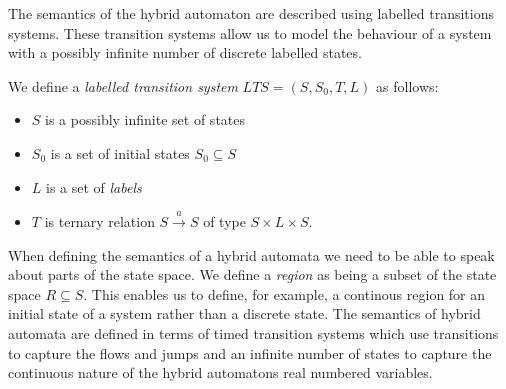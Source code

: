 The semantics of the hybrid automaton are described using labelled transitions systems. These transition systems allow us to model the behaviour of a system with a possibly infinite number of discrete labelled states. 
\medskip
\begin{mydef}
We define a \emph{labelled transition system} $LTS = (S,S_0,T,L)$ as follows:
\begin{itemize}

\item $S$ is a possibly infinite set of states

\item $S_0$ is a set of initial states $S_0 \subseteq S$

\item $L$ is a set of \emph{labels}

\item $T$ is ternary  relation $S \xrightarrow{a} S$ of type $S \times L \times S$.

\end{itemize}
\end{mydef}
\medskip
When defining the semantics of a hybrid automata we need to be able to speak about parts of the state space.  We define a \emph{region} as being a subset of the state space $R \subseteq S$.  This enables us to define, for example, a continous region for an initial state of a system rather than a discrete state. The semantics of hybrid automata are defined in terms of  timed transition systems which use transitions to capture the flows and jumps and an infinite number of states to capture the continuous nature of the hybrid automatons real numbered variables.

